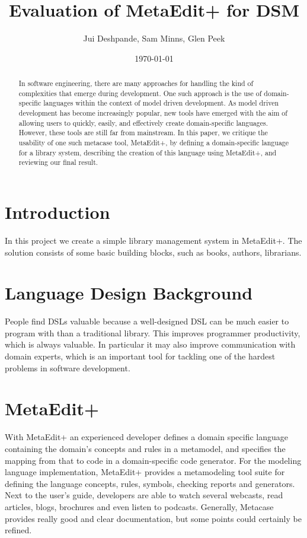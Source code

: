 \documentclass[12pt]{article}
\title{Evaluation of MetaEdit+ for DSM}
\author{Jui Deshpande, Sam Minns, Glen Peek}
\date{\today}
\begin{document}
\maketitle
\begin{abstract}
In software engineering, there are many approaches for handling the kind of complexities that emerge during development.  One such approach is the use of domain-specific languages within the context of model driven development.  As model driven development has become increasingly popular, new tools have emerged with the aim of allowing users to quickly, easily, and effectively create domain-specific languages.  However, these tools are still far from mainstream.  In this paper, we critique the usability of one such metacase tool, MetaEdit+, by defining a domain-specific language for a library system, describing the creation of this language using MetaEdit+, and reviewing our final result.  
\end{abstract}
\section{Introduction}
In this project we create a simple library management system in MetaEdit+. The solution consists of some basic building blocks, such as books, authors, librarians. 
\section{Language Design Background}
People find DSLs valuable because a well-designed DSL can be much easier to program with than a traditional library. This improves programmer productivity, which is always valuable. In particular it may also improve communication with domain experts, which is an important tool for tackling one of the hardest problems in software development.
\section{MetaEdit+}
With MetaEdit+ an experienced developer defines a domain specific language containing the domain’s concepts and rules in a metamodel, and specifies the mapping from that to code in a domain-specific code generator. For the modeling language implementation, MetaEdit+ provides a metamodeling tool suite for defining the language concepts, rules, symbols, checking reports and generators. Next to the user’s guide, developers are able to watch several webcasts, read articles, blogs, brochures and even listen to podcasts. Generally, Metacase provides really good and clear documentation, but some points could certainly be refined.
\end{document}
